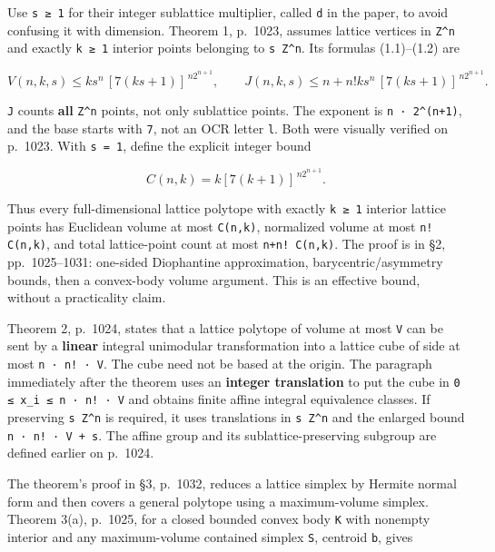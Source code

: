 \documentclass[11pt,a4paper,oneside]{report}
\begin{document}
Use \texttt{s ≥ 1} for their integer sublattice multiplier, called
\texttt{d} in the paper, to avoid confusing it with dimension. Theorem
1, p.~1023, assumes lattice vertices in \texttt{Z\textasciicircum{}n}
and exactly \texttt{k ≥ 1} interior points belonging to
\texttt{s Z\textasciicircum{}n}. Its formulas (1.1)--(1.2) are

\[
V(n,k,s)\le k s^n\,[7(ks+1)]^{\,n2^{n+1}},
\qquad
J(n,k,s)\le n+n! k s^n\,[7(ks+1)]^{\,n2^{n+1}}.
\]

\texttt{J} counts \textbf{all} \texttt{Z\textasciicircum{}n} points, not
only sublattice points. The exponent is
\texttt{n · 2\textasciicircum{}(\allowbreak{}n+1)}, and the base starts
with \texttt{7}, not an OCR letter \texttt{l}. Both were visually
verified on p.~1023. With \texttt{s =\allowbreak{} 1}, define the
explicit integer bound

\[
C(n,k)=k[7(k+1)]^{\,n2^{n+1}}.
\]

Thus every full-dimensional lattice polytope with exactly \texttt{k ≥ 1}
interior lattice points has Euclidean volume at most
\texttt{C(\allowbreak{}n,\allowbreak{}k)}, normalized volume at most
\texttt{n! C(\allowbreak{}n,\allowbreak{}k)}, and total lattice-point
count at most \texttt{n+n! C(\allowbreak{}n,\allowbreak{}k)}. The proof
is in §2, pp.~1025--1031: one-sided Diophantine approximation,
barycentric/asymmetry bounds, then a convex-body volume argument. This
is an effective bound, without a practicality claim.

Theorem 2, p.~1024, states that a lattice polytope of volume at most
\texttt{V} can be sent by a \textbf{linear} integral unimodular
transformation into a lattice cube of side at most \texttt{n · n! · V}.
The cube need not be based at the origin. The paragraph immediately
after the theorem uses an \textbf{integer translation} to put the cube
in \texttt{0 ≤ x\_\allowbreak{}i ≤ n · n! · V} and obtains finite affine
integral equivalence classes. If preserving
\texttt{s Z\textasciicircum{}n} is required, it uses translations in
\texttt{s Z\textasciicircum{}n} and the enlarged bound
\texttt{n · n! · V + s}. The affine group and its sublattice-preserving
subgroup are defined earlier on p.~1024.

The theorem's proof in §3, p.~1032, reduces a lattice simplex by Hermite
normal form and then covers a general polytope using a maximum-volume
simplex. Theorem 3(a), p.~1025, for a closed bounded convex body
\texttt{K} with nonempty interior and any maximum-volume contained
simplex \texttt{S}, centroid \texttt{b}, gives
\end{document}

